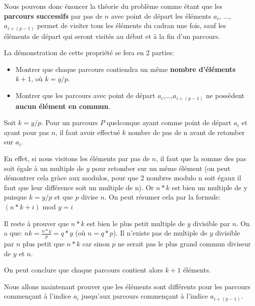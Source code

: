 \documentclass[a4paper, 12pt]{article}
\begin{document}
Nous pouvons donc énoncer la théorie du problème comme étant que les \textbf{parcours successifs} par pas de $n$ avec point de départ les éléments  $a_{i}$, ..., $a_{i+(p-1)}$ permet de visiter tous les éléments du cadran une fois, sauf les éléments de départ qui seront visités au début et à la fin d'un parcours.\newline

La démonstration de cette propriété se fera en 2 parties:
\begin{itemize}
\item Montrer que chaque parcours contiendra un même \textbf{nombre d'éléments} $k+1$, où $k = y/p$.
\item Montrer que les parcours avec point de départ $a_{i}$,...,$a_{i+(p-1)}$ ne possèdent \textbf{aucun élément en commun}.\newline
\end{itemize}

Soit $k = y/p$. Pour un parcours $P$ quelconque ayant comme point de départ $a_{i}$ et ayant pour pas $n$, il faut avoir effectué $k$ nombre de pas de n avant de retomber sur $a_{i}$. \newline

En effet, si nous visitons les éléments par pas de $n$, il faut que la somme des pas soit égale à un multiple de $y$ pour retomber sur un même élément (on peut démontrer cela gràce aux modulos, pour que 2 nombres modulo n soit égaux il faut que leur différence soit un multiple de n). Or $n*k$ est bien un multiple de y puisque $k = y/p$ et que $p$ divise $n$. On peut résumer cela par la formule:\newline
$(n*k+i)$ mod $y = i$ \newline

Il reste à prouver que $n*k$ est bien le plus petit multiple de $y$ divisible par $n$. On a que:\newline
$nk = \frac{n*y}{p} = q*y$ (où $n=q*p$).\newline
Il n'existe pas de multiple de $y$ divisible par $n$ plus petit que $n*k$ car sinon $p$ ne serait pas le plus grand commun diviseur de $y$ et $n$.\newline

On peut conclure que chaque parcours contient alors $k+1$ éléments. \newline

Nous allons maintenant prouver que les éléments sont différents pour les parcours commençant à l'indice $a_{i}$ jusqu'aux parcours commençant à l'indice $a_{i+(p-1)}$.\newline
\end{document}
